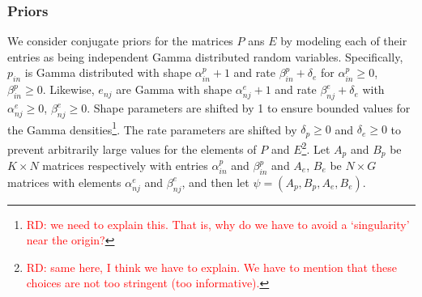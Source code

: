 \documentclass{bioinfo}
\begin{document}
\subsubsection{Priors} 
We consider conjugate priors for the matrices $P$ ans $E$ by modeling
each of their entries as being independent Gamma distributed random
variables. Specifically, $p_{in}$ is Gamma distributed with shape
$\alpha_{in}^p + 1$ and rate $\beta_{in}^p + \delta_e$ for
$\alpha_{in}^p \geqslant 0$, $\beta_{in}^p \geqslant 0$. Likewise,
$e_{nj}$ are Gamma with shape $\alpha_{nj}^e+1$ and rate $\beta_{nj}^e
+ \delta_e$ with $\alpha_{nj}^e \geqslant 0$, $\beta_{nj}^e \geqslant
0$. Shape parameters are shifted by 1 to ensure bounded values for the
Gamma densities\footnote{\textcolor{red}{RD: we need to explain this.
That is, why do we have to avoid a `singularity' near the origin?}}.
The rate parameters are shifted by $\delta_p \geqslant 0$ and
$\delta_e \geqslant 0$ to prevent arbitrarily large values for the
elements of $P$ and $E$\footnote{\textcolor{red}{RD: same here, I
    think we
 have to explain. We have to mention that these choices
    are not too 
    stringent  (too informative).}}. Let $A_p$ and $B_p$ be $K\times
N$  matrices
respectively with entries $\alpha_{in}^p$ and $\beta_{in}^p$ and
$A_e$, $B_e$ be $N\times G$ matrices with elements $\alpha_{nj}^e$ and
$\beta_{nj}^e$, and then let $\psi =  (A_p, B_p, A_e, B_e)$.
\end{document}
